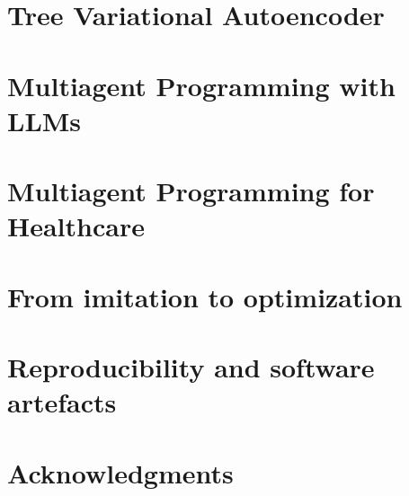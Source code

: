 \newpage
\chapter{Tree Variational Autoencoder}\label{ch:tree2tree}


\newpage
\chapter{Multiagent Programming with LLMs}\label{ch:seidr}


\newpage
\chapter{Multiagent Programming for Healthcare}\label{ch:seidrforhealth}

\newpage
\chapter{From imitation to optimization} \label{ch:mimicseq}


\newpage
\chapter{Reproducibility and software artefacts}





\newpage
\chapter{Acknowledgments}



\printbibliography


